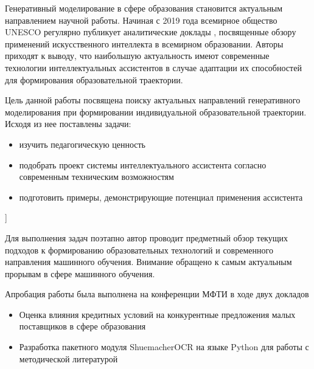 Генеративный моделирование в сфере образования становится актуальным направлением научной работы. 
Начиная с 2019 года всемирное общество UNESCO регулярно публикует аналитические доклады \cite{unesco2019beijing}\cite{annuvs2024education},
посвященные обзору применений искусственного интеллекта в всемирном образовании. Авторы приходят к выводу, что
наибольшую актуальность имеют современные технологии интеллектуальных ассистентов в случае адаптации их способностей
для формирования образовательной траектории.

Цель данной работы посвящена поиску актуальных направлений генеративного моделирования при формировании индивидуальной образовательной траектории.
Исходя из нее поставлены задачи:
\begin{itemize}
    \item изучить педагогическую ценность 
    \item подобрать проект системы интеллектуального ассистента согласно современным техническим возможностям
    \item подготовить примеры, демонстрирующие потенциал применения ассистента 
\end{itemize}]

Для выполнения задач поэтапно автор проводит предметный обзор текущих подходов к формированию образовательных технологий и
современного направления машинного обучения. Внимание обращено к самым актуальным прорывам в сфере машинного обучения.


Апробация работы была выполнена на конференции МФТИ в ходе двух докладов \begin{itemize}
    \item Оценка влияния кредитных условий на конкурентные предложения малых поставщиков в сфере образования
    \item Разработка пакетного модуля ShuemacherOCR на языке Python для работы с методической литературой    
\end{itemize}
